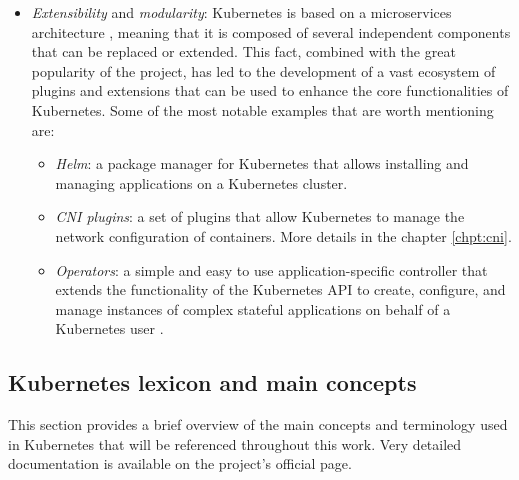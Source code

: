 \begin{itemize}
   \item \textit{Extensibility} and \textit{modularity}: Kubernetes is based on
     a microservices architecture \cite{Ding2023}, meaning that it is composed
     of several independent components that can be replaced or extended.
     This fact, combined with the great popularity of the project, has led to
     the development of a vast ecosystem of plugins and extensions that can be
     used to enhance the core functionalities of Kubernetes.
     Some of the most notable examples that are worth mentioning are:
     \begin{itemize}
       \itemsep0em
       \item \textit{Helm}: a package manager for Kubernetes that allows
         installing and managing applications on a Kubernetes cluster.
       \item \textit{CNI plugins}: a set of plugins that allow Kubernetes to
         manage the network configuration of containers. More details in the chapter
         \ref{chpt:cni}.
       \item \textit{Operators}: a simple and easy to use application-specific
         controller that extends the functionality of the Kubernetes API to
         create, configure, and manage instances of complex stateful
         applications on behalf of a Kubernetes user \cite{bookofkubernetes}.
     \end{itemize}
\end{itemize}

\subsection{Kubernetes lexicon and main concepts}


This section provides a brief overview of the main concepts and
terminology used in Kubernetes that will be referenced throughout this work.
Very detailed documentation is available on the project's official page.

